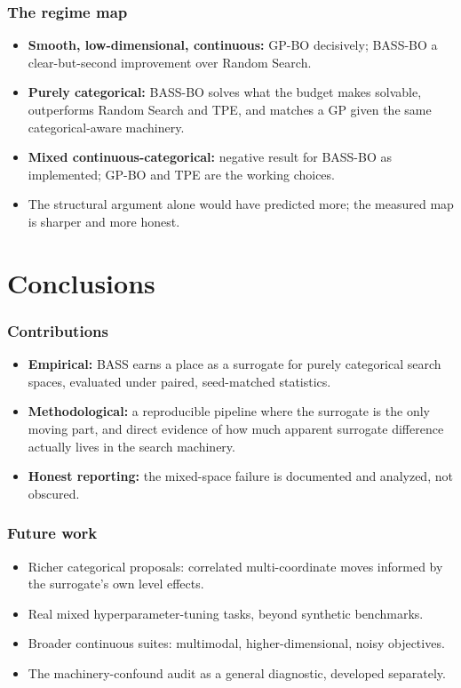 \documentclass[fleqn]{beamer}
\begin{document}
\begin{frame}
  \frametitle{The regime map}
  \begin{itemize}
    \item \textbf{Smooth, low-dimensional, continuous:} GP-BO decisively; BASS-BO a clear-but-second improvement over Random Search.
    \item \textbf{Purely categorical:} BASS-BO solves what the budget makes solvable, outperforms Random Search and TPE, and matches a GP given the same categorical-aware machinery.
    \item \textbf{Mixed continuous-categorical:} negative result for BASS-BO as implemented; GP-BO and TPE are the working choices.
    \item The structural argument alone would have predicted more; the measured map is sharper and more honest.
  \end{itemize}
\end{frame}

\section{Conclusions}

\begin{frame}
  \frametitle{Contributions}
  \begin{itemize}
    \item \textbf{Empirical:} BASS earns a place as a surrogate for purely categorical search spaces, evaluated under paired, seed-matched statistics.
    \item \textbf{Methodological:} a reproducible pipeline where the surrogate is the only moving part, and direct evidence of how much apparent surrogate difference actually lives in the search machinery.
    \item \textbf{Honest reporting:} the mixed-space failure is documented and analyzed, not obscured.
  \end{itemize}
\end{frame}

\begin{frame}
  \frametitle{Future work}
  \begin{itemize}
    \item Richer categorical proposals: correlated multi-coordinate moves informed by the surrogate's own level effects.
    \item Real mixed hyperparameter-tuning tasks, beyond synthetic benchmarks.
    \item Broader continuous suites: multimodal, higher-dimensional, noisy objectives.
    \item The machinery-confound audit as a general diagnostic, developed separately.
  \end{itemize}
\end{frame}
\end{document}
